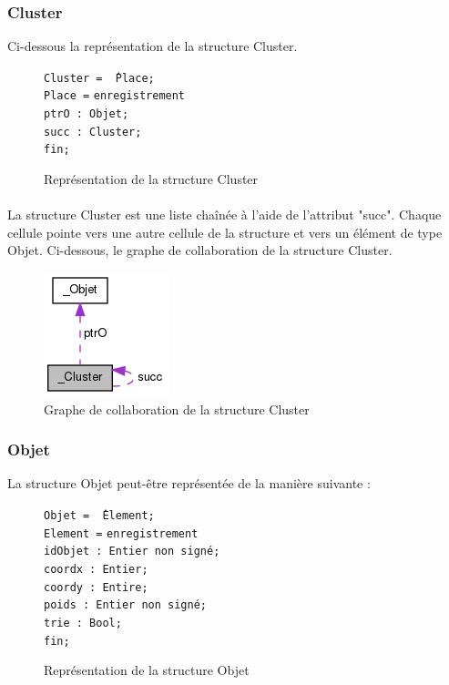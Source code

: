 \documentclass[twoside,UTF8]{EPURapport}
\begin{document}
\subsubsection{Cluster}

Ci-dessous la représentation de la structure Cluster. 
\begin{figure}[!h]

\begin{tabbing}
\texttt{Cluster = \^\,Place;} \\
\texttt{Place =} \= \texttt{enregistrement} \\
\> \texttt{ptrO : Objet;} \\
\> \texttt{succ : Cluster;} \\
\> \texttt{fin;}\\
\end{tabbing}

\caption{Représentation de la structure Cluster}
\end{figure}

\paragraph{}
La structure Cluster est une liste cha\^inée à l'aide de l'attribut "succ". Chaque cellule pointe vers une autre cellule de la structure et vers un élément de type Objet.
Ci-dessous, le graphe de collaboration de la structure Cluster.  

\begin{figure}[!h]
\center
\includegraphics[scale=0.5]{images/struct_cluster.png}
\caption{Graphe de collaboration de la structure Cluster}
\end{figure} 

\subsubsection{Objet}
\label{subsec:Objet.h}
La structure Objet peut-\^etre représentée de la manière suivante : 
\begin{figure}[!h]
\begin{tabbing}
\texttt{Objet = \^\,Element;}\\
\texttt{Element =} \= \texttt{enregistrement}\\
\> \texttt{idObjet : Entier non signé;} \\
\> \texttt{coordx : Entier;} \\
\> \texttt{coordy : Entire;} \\
\> \texttt{poids : Entier non signé;} \\
\> \texttt{trie : Bool;} \\
\> \texttt{fin;}\\
\end{tabbing}

\caption{Représentation de la structure Objet}
\end{figure}
\end{document}
